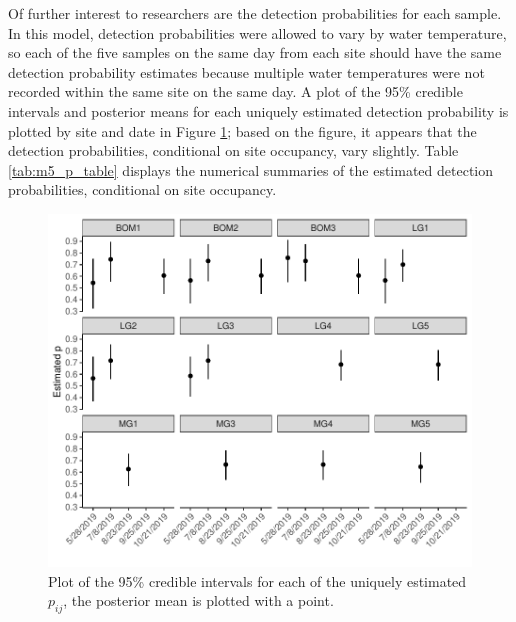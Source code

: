 \documentclass[12pt]{article}\usepackage[]{graphicx}\usepackage[]{color}
\makeatletter
\def\maxwidth{ %
  \ifdim\Gin@nat@width>\linewidth
    \linewidth
  \else
    \Gin@nat@width
  \fi
}
\newenvironment{knitrout}{}{} %
\def\maxwidth{ %
  \ifdim\Gin@nat@width>\linewidth
    \linewidth
  \else
    \Gin@nat@width
  \fi
}
\newenvironment{knitrout}{}{} %
\makeatother
\begin{document}
Of further interest to researchers are the detection probabilities for each sample. In this model, detection probabilities were allowed to vary by water temperature, so each of the five samples on the same day from each site should have the same detection probability estimates because multiple water temperatures were not recorded within the same site on the same day. A plot of the 95\% credible intervals and posterior means for each uniquely estimated detection probability is plotted by site and date in Figure \ref{fig:m5_cred_p}; based on the figure, it appears that the detection probabilities, conditional on site occupancy, vary slightly. Table \ref{tab:m5_p_table} displays the numerical summaries of the estimated detection probabilities, conditional on site occupancy. 

\begin{figure}
\begin{knitrout}
\color{fgcolor}
\includegraphics[width=\maxwidth]{figure/m5_p-1} 

\end{knitrout}
\caption{Plot of the 95\% credible intervals for each of the uniquely estimated $p_{ij}$, the posterior mean is plotted with a point.}
\label{fig:m5_cred_p}
\end{figure}
\end{document}

